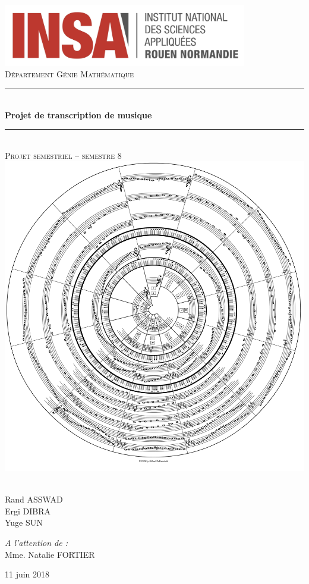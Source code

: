 \documentclass[]{article}
\title{}
\author{}
\date{}
\newcommand{\HRule}{\rule{\linewidth}{0.5mm}}
\begin{document}
\begin{titlepage}
  \begin{sffamily}
  \begin{center}
	\includegraphics[width=0.8\textwidth]{img/INSA_logo}\\[2cm]

    \textsc{\huge Département Génie Mathématique}\\[0.7cm]

    \HRule \\[0.4cm]
    {\huge \bfseries Projet de transcription de musique \\[0.4cm]}
    \HRule \\[1cm]
	\textsc{\huge Projet semestriel -- semestre 8}\\[0.7cm]

    \includegraphics[width=.6\textwidth]{img/cover_img.png}~\\[1cm]

    \begin{minipage}{0.4\textwidth}
		\Large\raggedright
        Rand ASSWAD\\
		Ergi DIBRA\\
		Yuge SUN
    \end{minipage}
    \begin{minipage}{0.4\textwidth}
		\Large\raggedleft
		\emph{A l'attention de :}\\
		Mme. Natalie FORTIER
    \end{minipage}

	\vfill
    {\large 11 juin 2018}
  \end{center}
  \end{sffamily}
\end{titlepage}
\end{document}
